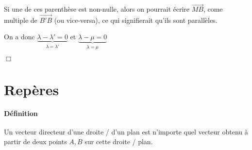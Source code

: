\documentclass[
    11pt,
    a4paper,
    oneside,
    headinlcude, footinclude,
    twoside,
]{report}
\renewcommand{\vec}[1]{\overrightarrow{#1}}
\begin{document}
Si une de ces parenthèse est non-nulle, alors on pourrait écrire $\vec{MB}$,
come multiple de $\vec{B'B}$ (ou vice-versa), ce qui signifierait qu'ils sont
parallèles.

On a donc $\underbrace{\lambda - \lambda' = 0}_\text{$\lambda = \lambda'$}$ et 
$\underbrace{\lambda - \mu = 0}_\text{$\lambda = \mu$}$

\begin{flushright}
    $\Box$
\end{flushright}

\section{Repères}
\label{sub:reperes}

\paragraph{Définition}
\label{par:definition}

Un vecteur directeur d'une droite / d'un plan est n'importe quel vecteur
obtenu à partir de deux points $A, B$ sur cette droite / plan.
\end{document}
